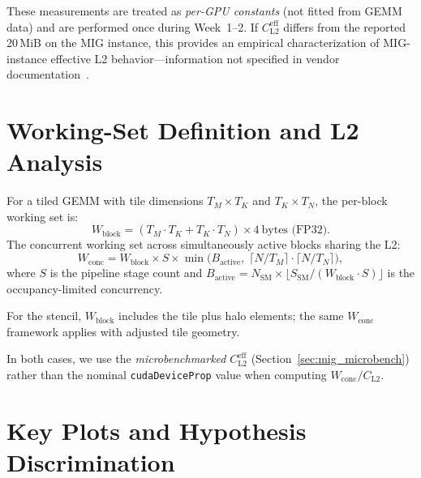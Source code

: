 \documentclass[sigplan,nonacm,10pt]{acmart}
\begin{document}
These measurements are treated as \emph{per-GPU constants} (not
fitted from GEMM data) and are performed once during Week~1--2.
If $C_{\text{L2}}^{\text{eff}}$ differs from the reported 20\,MiB on
the MIG instance, this provides an empirical characterization of
MIG-instance effective L2 behavior---information not specified in
vendor documentation~\cite{mig_guide}.

\section{Working-Set Definition and L2 Analysis}
\label{sec:ws}

For a tiled GEMM with tile dimensions $T_M \times T_K$ and
$T_K \times T_N$, the per-block working set is:
\[
  W_{\text{block}} = (T_M \cdot T_K + T_K \cdot T_N) \times 4
  ~\text{bytes (FP32)}.
\]
The concurrent working set across simultaneously active blocks sharing
the L2:
\[
  W_{\text{conc}} = W_{\text{block}} \times S \times
  \min\!\bigl(B_{\text{active}},\;
  \lceil N/T_M \rceil \cdot \lceil N/T_N \rceil\bigr),
\]
where $S$ is the pipeline stage count and
$B_{\text{active}} = N_{\text{SM}} \times
\lfloor S_{\text{SM}} / (W_{\text{block}} \cdot S) \rfloor$
is the occupancy-limited concurrency.

For the stencil, $W_{\text{block}}$ includes the tile plus halo
elements; the same $W_{\text{conc}}$ framework applies with adjusted
tile geometry.

In both cases, we use the \emph{microbenchmarked}
$C_{\text{L2}}^{\text{eff}}$ (Section~\ref{sec:mig_microbench}) rather
than the nominal \texttt{cudaDeviceProp} value when computing
$W_{\text{conc}} / C_{\text{L2}}$.

\section{Key Plots and Hypothesis Discrimination}
\label{sec:plots}
\end{document}
